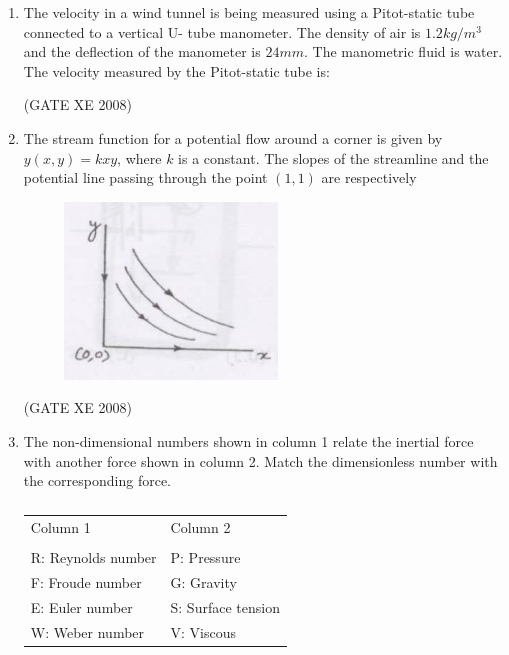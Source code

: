 \documentclass[12pt]{article}
\begin{document}
\begin{enumerate}
(GATE XE 2008)
\item The velocity in a wind tunnel is being measured using a Pitot-static tube connected to a vertical U- tube manometer. The density of air is $1.2 kg/m^3$ and the deflection of the manometer is $24 mm$. The manometric fluid is water. The velocity measured by the Pitot-static tube is:

\begin{enumerate}
\end{enumerate}


(GATE XE 2008)
\item  The stream function for a potential flow around a corner is given by $y(x, y) = kxy$, where $k$ is a constant. The slopes of the streamline and the potential line passing through the point $(1,1)$ are respectively

\begin{figure}[H]
\centering
  \includegraphics[width=0.3\columnwidth]{figs/ass1_d_q12.png}
  \caption{}
\end{figure} 

\begin{enumerate}
\end{enumerate}

(GATE XE 2008)
\item The non-dimensional numbers shown in column 1 relate the inertial force with another force shown in column 2. Match the dimensionless number with the corresponding force.

\begin{table}[H]     \centering     \caption{}     \label{}     \begin{tabular}{l   l}
    Column 1 & Column 2 \\
      &  \\
   R: Reynolds number & P: Pressure\\
F: Froude number & G: Gravity\\
E: Euler number & S: Surface tension\\
W: Weber number & V: Viscous\\
\end{tabular} \end{table}


\end{enumerate}
\end{document}

